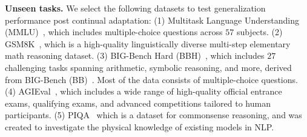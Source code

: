 \textbf{Unseen tasks.} We select the following datasets to test generalization performance post continual adaptation: (1) Multitask Language Understanding (MMLU)~\cite{hendrycks2020measuring}, which includes multiple-choice questions across $57$ subjects. (2) GSM8K~\cite{cobbe2021training}, which is a high-quality linguistically diverse multi-step elementary math reasoning dataset. (3) BIG-Bench Hard (BBH)~\cite{suzgun2022challenging},
which includes $27$ challenging tasks spanning arithmetic, symbolic reasoning, and more, derived from
BIG-Bench (BB)~\cite{srivastava2022beyond}. Most of the data consists of multiple-choice questions. (4) AGIEval~\cite{zhong2023agieval}, which includes a wide range of high-quality official entrance exams, qualifying exams, and advanced competitions tailored to human participants. (5) PIQA~\cite{bisk2020piqa} which is a dataset for commonsense reasoning, and was created to investigate the physical knowledge of existing models in NLP.

